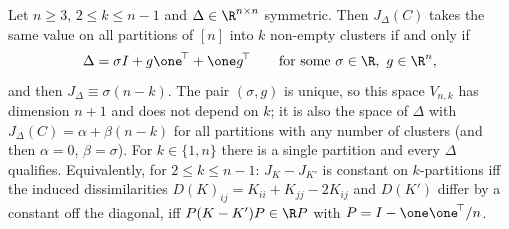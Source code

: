 \begin{proposition}\label{prop:invcomplete}
Let $n\ge3$, $2\le k\le n-1$ and $\Delta\in\R^{n\times n}$ symmetric. Then $J_\Delta(C)$ takes the same value on all partitions of $[n]$ into $k$ non-empty clusters if and only if
\[
\Delta=\sigma I+g\one^{\!\top}+\one g^{\!\top}\qquad\text{for some }\sigma\in\R,\ g\in\R^n,
\]
and then $J_\Delta\equiv\sigma(n-k)$. The pair $(\sigma,g)$ is unique, so this space $V_{n,k}$ has dimension $n+1$ and does not depend on $k$; it is also the space of $\Delta$ with $J_\Delta(C)=\alpha+\beta(n-k)$ for all partitions with any number of clusters (and then $\alpha=0$, $\beta=\sigma$). For $k\in\{1,n\}$ there is a single partition and every $\Delta$ qualifies. Equivalently, for $2\le k\le n-1$: $J_K-J_{K'}$ is constant on $k$-partitions iff the induced dissimilarities $D(K)_{ij}=K_{ii}+K_{jj}-2K_{ij}$ and $D(K')$ differ by a constant off the diagonal, iff $P(K-K')P\in\R P$ with $P=I-\one\one^{\!\top}/n$. 
\end{proposition}
